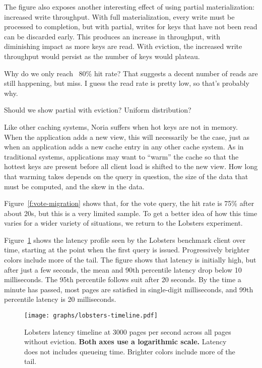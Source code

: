 The figure also exposes another interesting effect of using partial
materialization: increased write throughput. With full materialization, every
write must be processed to completion, but with partial, writes for keys that
have not been read can be discarded early. This produces an increase in
throughput, with diminishing impact as more keys are read. With eviction, the
increased write throughput would persist as the number of keys would plateau.

\begin{inprogress}
  Why do we only reach ~80\% hit rate? That suggests a decent number of reads
  are still happening, but miss. I guess the read rate is pretty low, so that's
  probably why.
\end{inprogress}

\begin{inprogress}
  Should we show partial with eviction?
  Uniform distribution?
\end{inprogress}

Like other caching systems, Noria suffers when hot keys are not in memory. When
the application adds a new view, this will necessarily be the case, just as when
an application adds a new cache entry in any other cache system. As in
traditional systems, applications may want to ``warm'' the cache so that the
hottest keys are present before all client load is shifted to the new view. How
long that warming takes depends on the query in question, the size of the data
that must be computed, and the skew in the data.

Figure~\ref{f:vote-migration} shows that, for the vote query, the hit rate is
75\% after about 20s, but this is a very limited sample. To get a better idea of
how this time varies for a wider variety of situations, we return to the
Lobsters experiment.

Figure~\ref{f:lobsters-timeline} shows the latency profile seen by the Lobsters
benchmark client over time, starting at the point when the first query is
issued. Progressively brighter colors include more of the tail. The figure
shows that latency is initially high, but after just a few seconds, the mean and
90th percentile latency drop below 10 milliseconds. The 95th percentile follows
suit after 20 seconds. By the time a minute has passed, most pages are satisfied
in single-digit milliseconds, and 99th percentile latency is 20 milliseconds.

\begin{figure}[t]
  \centering
  \texttt{[image: graphs/lobsters-timeline.pdf]}
  \caption{Lobsters latency timeline at 3000 pages per second across all pages
  without eviction. \textbf{Both axes use a logarithmic scale.} Latency does not
  includes queueing time. Brighter colors include more of the tail.}
  \label{f:lobsters-timeline}
\end{figure}

